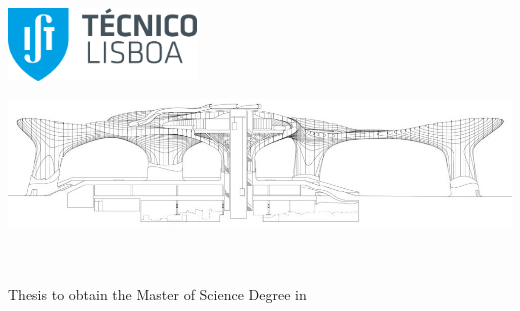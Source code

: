 
\begin{titlepage}
\includegraphics[width=5cm]{images/ist_logo}~\\
%
\if{}
  \vspace*{\finalLogoSpacing}
\else
  \vspace*{\draftLogoSpacing}
\fi

\includegraphics[width=\textwidth]{images/parasol}

\begin{center}
{\LARGE \textbf{\Title}}\\[2.0cm]
{\Large \textbf{\StudentName}}\\[1.0cm]
{\large Thesis to obtain the Master of Science Degree in}\\[0.5cm]
{\LARGE \textbf{\DegreeName}}\\[1.0cm]


\end{center}
\end{titlepage}
